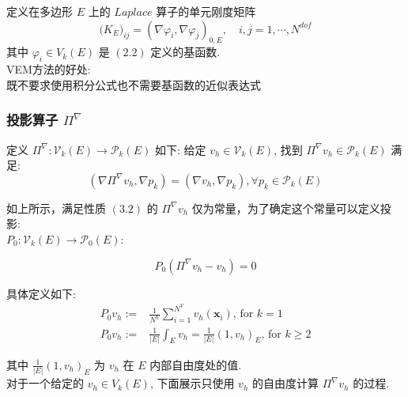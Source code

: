     定义在多边形 $E$ 上的 $Laplace$ 算子的单元刚度矩阵\\
    \begin{equation}
    \mathbf(K_E)_{ij} = (\nabla\varphi_i, \nabla\varphi_j)_{0,E},\quad i,j = 1,\cdots,N^{dof}
    \end{equation}
    其中 $\varphi_i \in V_k(E)$ 是 $(2.2)$ 定义的基函数. \\
    
    VEM方法的好处:\\
    
    既不要求使用积分公式也不需要基函数的近似表达式\\
    
     \subsubsection{投影算子 $\Pi^{\nabla}$}
    
    定义 $\Pi^\nabla: \mathcal V_k(E)\rightarrow \mathcal{P}_k(E)$ 如下: 给定  $ v_h \in
    \mathcal V_k(E)$, 找到 $\Pi^\nabla v_h \in \mathcal{P}_k(E)$ 满足: \\
    \begin{equation}
    (\nabla \Pi^\nabla v_h, \nabla p_k) = (\nabla v_h, \nabla p_k), \forall p_k\in\mathcal{P}_k(E)
    \end{equation}
    
    如上所示，满足性质 $(3.2)$ 的 $\Pi^{\nabla}v_h$ 仅为常量，为了确定这个常量可以定义投影: \\
    $ P_0: \mathcal V_k(E) \rightarrow
    \mathcal{P}_0(E)$:
    
    \begin{equation}
    P_0(\Pi^\nabla v_h - v_h) = 0
    \end{equation}
    
    具体定义如下: \\
    \begin{equation}
    \begin{aligned}
    P_0 v_h :=& \frac{1}{N^V}\sum_{i=1}^{N^V} v_h(\mathbf x_i)\text{, for } k=1 \\
    P_0 v_h :=& \frac{1}{|E|} \int_{E}v_h = \frac{1}{|E|} (1, v_h)_E\text{, for } k\geq 2
    \end{aligned}
    \end{equation}
    
    其中 $\frac{1}{|E|} (1, v_h)_E$ 为 $v_h$ 在 $E$ 内部自由度处的值.\\
    
    对于一个给定的 $v_h \in V_k(E)$, 下面展示只使用 $v_h$ 的自由度计算 $\Pi^{\nabla}v_h$ 的过程. \\
    
